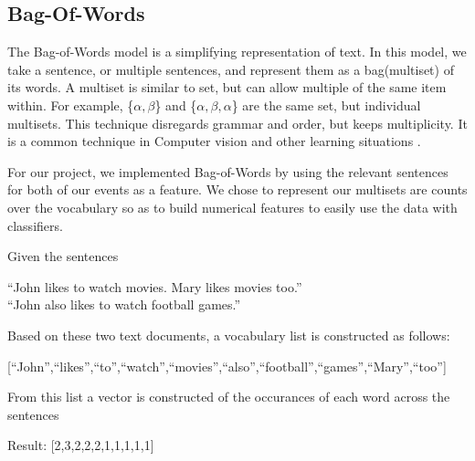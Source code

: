 \documentclass[bsc,frontabs,twoside,singlespacing,parskip,deptreport]{infthesis}     %
\begin{document}
\subsection{Bag-Of-Words}
The Bag-of-Words model is a simplifying representation of text.
In this model, we take a sentence, or multiple sentences, and represent them as a bag(multiset) of its words.
A multiset is similar to set, but can allow multiple of the same item within.
For example, \{$\alpha,\beta$\} and \{$\alpha,\beta,\alpha$\} are the same set, but individual multisets.
This technique disregards grammar and order, but keeps multiplicity. It is a common technique in Computer vision
and other learning situations \cite{}.


For our project, we implemented Bag-of-Words by using the relevant sentences for both of our events as a feature.
We chose to represent our multisets are counts over the vocabulary so as to build numerical features to easily
use the data with classifiers.
\newpage
\begin{tcolorbox}[width=\textwidth,
                  interior hidden,
                  boxsep=10pt,
                  left=0pt,
                  right=0pt,
                  top=2pt,
                  ]%
  Given the sentences \vspace{0.5em}\\
  \begin{center}``John likes to watch movies. Mary likes movies too.''\\
  ``John also likes to watch football games.''\vspace{1em}\\
   \end{center}
    Based on these two text documents, a vocabulary list is constructed as follows:\vspace{1em}\\
    \begin{center}
  [``John'',``likes'',``to'',``watch'',``movies'',``also'',``football'',``games'',``Mary'',``too'']\vspace{1em}\\
\end{center}
    From this list a vector is constructed of the occurances
    of each word across the sentences\vspace{1em}\\
 \begin{center} 
  Result: [2,3,2,2,2,1,1,1,1,1]
\end{center}
\end{tcolorbox}
\end{document}
